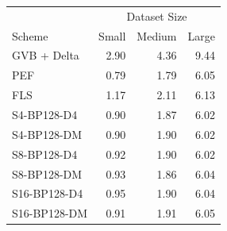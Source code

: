 \begin{tabular}{lrrr}
\toprule
 & \multicolumn{3}{c}{Dataset Size} \\
Scheme & Small & Medium & Large \\
\midrule
GVB + Delta & 2.90 & 4.36 & 9.44 \\
PEF & 0.79 & 1.79 & 6.05 \\
FLS & 1.17 & 2.11 & 6.13 \\
S4-BP128-D4 & 0.90 & 1.87 & 6.02 \\
S4-BP128-DM & 0.90 & 1.90 & 6.02 \\
S8-BP128-D4 & 0.92 & 1.90 & 6.02 \\
S8-BP128-DM & 0.93 & 1.86 & 6.04 \\
S16-BP128-D4 & 0.95 & 1.90 & 6.04 \\
S16-BP128-DM & 0.91 & 1.91 & 6.05 \\
\bottomrule
\end{tabular}
